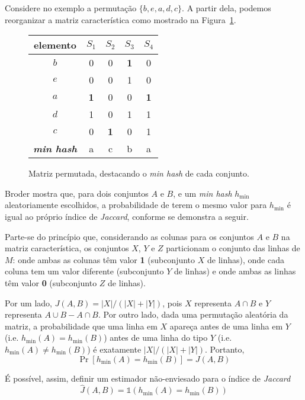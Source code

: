 Considere no exemplo a permutação $\{b, e, a, d, c\}$. A partir dela, podemos reorganizar a matriz característica como mostrado na Figura~\ref{fig:minhash_charmatrix_permutated}.

\begin{figure}[!htbp]
\centering
\begin{tabular}{ c || c | c | c | c }
 elemento & $S_1$ & $S_2$ & $S_3$ & $S_4$ \\
\hline
  $b$ & 0   & 0   & \colorbox{gray!30}{\textbf{1}}   & 0   \\
  $e$ & 0   & 0   & 1   & 0   \\
  $a$ & \colorbox{gray!30}{\textbf{1}}   & 0   & 0   & \colorbox{gray!30}{\textbf{1}}   \\
  $d$ & 1   & 0   & 1   & 1   \\
  $c$ & 0   & \colorbox{gray!30}{\textbf{1}}   & 0   & 1   \\
\hline

  \textbf{\emph{min hash}} & a & c & b & a \\

\end{tabular}
\caption{Matriz permutada, destacando o \emph{min hash} de cada conjunto.}
\label{fig:minhash_charmatrix_permutated}
\end{figure}


Broder \cite{broder1997resemblance} mostra que, para dois conjuntos $A$ e $B$, e um \emph{min hash} $h_{\min}$ aleatoriamente escolhidos, a probabilidade de terem o mesmo valor para $h_{\min}$ é igual ao próprio índice de \emph{Jaccard}, conforme se demonstra a seguir.

Parte-se do princípio que, considerando as colunas para os conjuntos $A$ e $B$ na matriz característica, os conjuntos $X$, $Y$ e $Z$ particionam o conjunto das linhas de $M$: onde ambas as colunas têm valor \textbf{1} (subconjunto $X$ de linhas), onde cada coluna tem um valor diferente (subconjunto $Y$ de linhas) e onde ambas as linhas têm valor \textbf{0} (subconjunto $Z$ de linhas).

Por um lado, $J(A, B) = |X|/(|X|+|Y|)$, pois $X$ representa $A \cap B$ e $Y$ representa $A \cup B - A \cap B$. Por outro lado, dada uma permutação aleatória da matriz, a probabilidade que uma linha em $X$ apareça antes de uma linha em $Y$ (i.e. $h_{\min}(A) = h_{\min}(B)$) antes de uma linha do tipo $Y$ (i.e. $h_{\min}(A) \neq h_{\min}(B)$) é exatamente $|X|/(|X|+|Y|)$. Portanto,
\[
\Pr[h_{\min}(A) = h_{\min}(B)] = J(A, B)
\]

É possível, assim, definir um estimador não-enviesado para o índice de \emph{Jaccard}
\[ 
   \hat{J}(A, B) = \mathds{1}(h_{\min}(A) = h_{\min}(B))
\]

